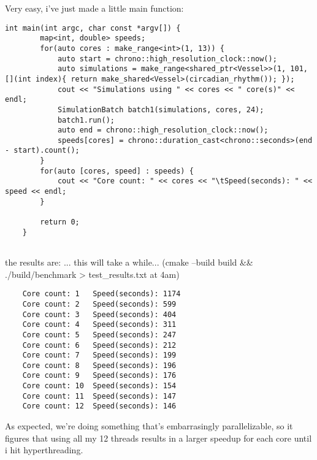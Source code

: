 Very easy, i've just made a little main function:

\begin{lstlisting}[style=colorC++]
    int main(int argc, char const *argv[]) {
        map<int, double> speeds;
        for(auto cores : make_range<int>(1, 13)) {
            auto start = chrono::high_resolution_clock::now();
            auto simulations = make_range<shared_ptr<Vessel>>(1, 101, [](int index){ return make_shared<Vessel>(circadian_rhythm()); });
            cout << "Simulations using " << cores << " core(s)" << endl;
            SimulationBatch batch1(simulations, cores, 24);
            batch1.run();
            auto end = chrono::high_resolution_clock::now();
            speeds[cores] = chrono::duration_cast<chrono::seconds>(end - start).count();
        }
        for(auto [cores, speed] : speeds) {
            cout << "Core count: " << cores << "\tSpeed(seconds): " << speed << endl;
        }
    
        return 0;
    }
    
\end{lstlisting}

the results are: ... this will take a while... (cmake --build build \&\& ./build/benchmark > test\_results.txt at 4am)

\begin{lstlisting}
    Core count: 1   Speed(seconds): 1174
    Core count: 2   Speed(seconds): 599
    Core count: 3   Speed(seconds): 404
    Core count: 4   Speed(seconds): 311
    Core count: 5   Speed(seconds): 247
    Core count: 6   Speed(seconds): 212
    Core count: 7   Speed(seconds): 199
    Core count: 8   Speed(seconds): 196
    Core count: 9   Speed(seconds): 176
    Core count: 10  Speed(seconds): 154
    Core count: 11  Speed(seconds): 147
    Core count: 12  Speed(seconds): 146
\end{lstlisting}

As expected, we're doing something that's embarrasingly parallelizable, so it figures that using all my 12 threads results in a larger speedup for each core until i hit hyperthreading.